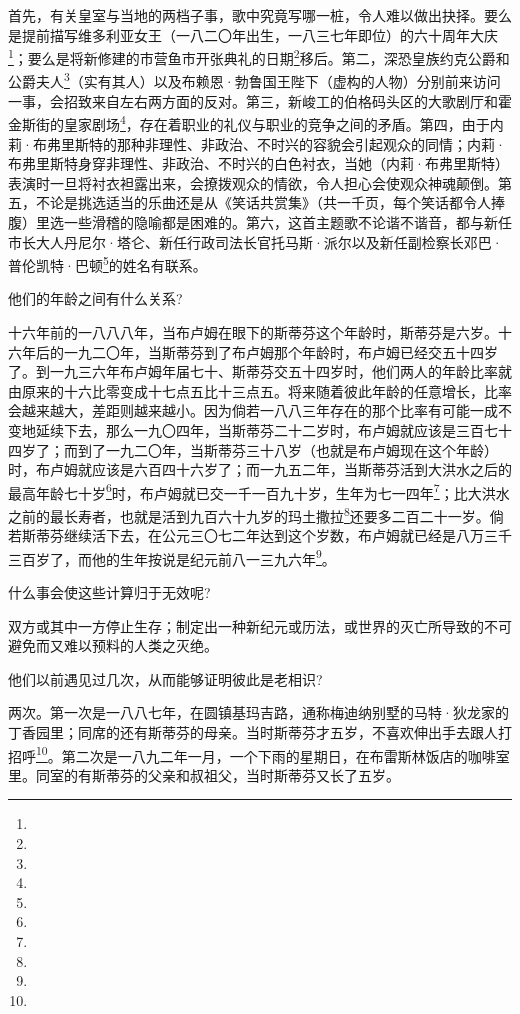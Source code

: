 \par 首先，有关皇室与当地的两档子事，歌中究竟写哪一桩，令人难以做出抉择。要么是提前描写维多利亚女王（一八二〇年出生，一八三七年即位）的六十周年大庆\footnote{}；要么是将新修建的市营鱼市开张典礼的日期\footnote{}移后。第二，深恐皇族约克公爵和公爵夫人\footnote{}（实有其人）以及布赖恩·勃鲁国王陛下（虚构的人物）分别前来访问一事，会招致来自左右两方面的反对。第三，新峻工的伯格码头区的大歌剧厅和霍金斯街的皇家剧场\footnote{}，存在着职业的礼仪与职业的竞争之间的矛盾。第四，由于内莉·布弗里斯特的那种非理性、非政治、不时兴的容貌会引起观众的同情；内莉·布弗里斯特身穿非理性、非政治、不时兴的白色衬衣，当她（内莉·布弗里斯特）表演时一旦将衬衣袒露出来，会撩拨观众的情欲，令人担心会使观众神魂颠倒。第五，不论是挑选适当的乐曲还是从《笑话共赏集》（共一千页，每个笑话都令人捧腹）里选一些滑稽的隐喻都是困难的。第六，这首主题歌不论谐不谐音，都与新任市长大人丹尼尔·塔仑、新任行政司法长官托马斯·派尔以及新任副检察长邓巴·普伦凯特·巴顿\footnote{}的姓名有联系。
\par 他们的年龄之间有什么关系?
\par 十六年前的一八八八年，当布卢姆在眼下的斯蒂芬这个年龄时，斯蒂芬是六岁。十六年后的一九二〇年，当斯蒂芬到了布卢姆那个年龄时，布卢姆已经交五十四岁了。到一九三六年布卢姆年届七十、斯蒂芬交五十四岁时，他们两人的年龄比率就由原来的十六比零变成十七点五比十三点五。将来随着彼此年龄的任意增长，比率会越来越大，差距则越来越小。因为倘若一八八三年存在的那个比率有可能一成不变地延续下去，那么一九〇四年，当斯蒂芬二十二岁时，布卢姆就应该是三百七十四岁了；而到了一九二〇年，当斯蒂芬三十八岁（也就是布卢姆现在这个年龄）时，布卢姆就应该是六百四十六岁了；而一九五二年，当斯蒂芬活到大洪水之后的最高年龄七十岁\footnote{}时，布卢姆就已交一千一百九十岁，生年为七一四年\footnote{}；比大洪水之前的最长寿者，也就是活到九百六十九岁的玛土撒拉\footnote{}还要多二百二十一岁。倘若斯蒂芬继续活下去，在公元三〇七二年达到这个岁数，布卢姆就已经是八万三千三百岁了，而他的生年按说是纪元前八一三九六年\footnote{}。
\par 什么事会使这些计算归于无效呢?
\par 双方或其中一方停止生存；制定出一种新纪元或历法，或世界的灭亡所导致的不可避免而又难以预料的人类之灭绝。
\par 他们以前遇见过几次，从而能够证明彼此是老相识?
\par 两次。第一次是一八八七年，在圆镇基玛吉路，通称梅迪纳别墅的马特·狄龙家的丁香园里；同席的还有斯蒂芬的母亲。当时斯蒂芬才五岁，不喜欢伸出手去跟人打招呼\footnote{}。第二次是一八九二年一月，一个下雨的星期日，在布雷斯林饭店的咖啡室里。同室的有斯蒂芬的父亲和叔祖父，当时斯蒂芬又长了五岁。

